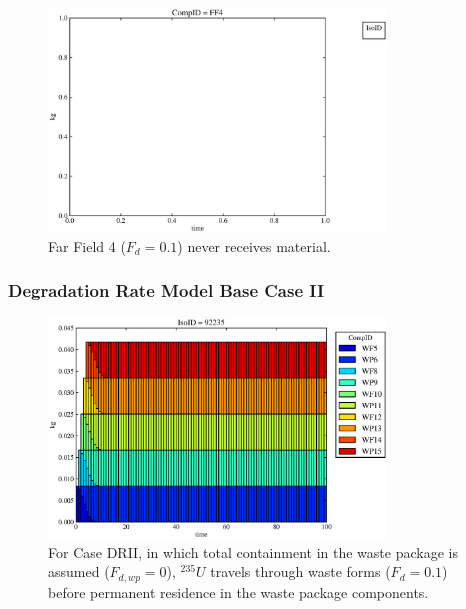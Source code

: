 \begin{frame}
\begin{figure}
\begin{minipage}[b]{0.45\linewidth}
  \includegraphics[width=0.8\textwidth]{./images/drI0.eps}
  \caption[Case DRI Far Field Contaminants.]{ 
    Far Field 4 ($F_d = 0.1$) never receives material.
    }
  \label{fig:drIff0}

  \end{minipage}
\end{figure}
\end{frame}



\begin{frame}[ctb!]
  \frametitle{Degradation Rate Model Base Case II}
\begin{figure}[ht]
\centering
\includegraphics[width=0.8\textwidth]{./images/drII.eps}
\caption[$^{235}U$ residence. Degradation Rate Waste Package No Release.]{
For Case DRII, in which total containment in the waste package is assumed ($F_{d,wp}=0$), 
$^{235}U$ travels through waste forms ($F_d = 0.1$) before 
permanent residence in the waste package components.
}
\label{fig:drIIall}
\end{figure}
\end{frame}

